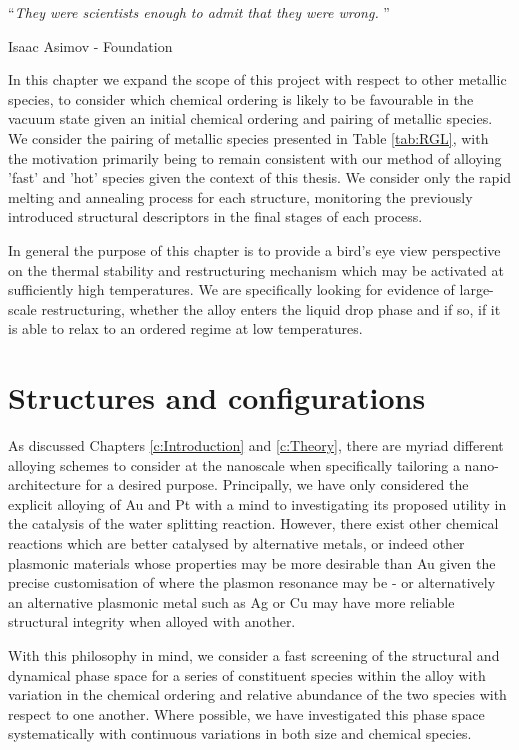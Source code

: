 
\noindent\enquote{\itshape They were scientists enough to admit that they were wrong. }\bigbreak

\hfill Isaac Asimov - Foundation

\vspace*{0.05\textheight}

In this chapter we expand the scope of this project with respect to other metallic species, to consider which chemical ordering is likely to be favourable in the vacuum state given an initial chemical ordering and pairing of metallic species. We consider the pairing of metallic species presented in Table \ref{tab:RGL}, with the motivation primarily being to remain consistent with our method of alloying 'fast' and 'hot' species given the context of this thesis. We consider only the rapid melting and annealing process for each structure, monitoring the previously introduced structural descriptors in the final stages of each process.

In general the purpose of this chapter is to provide a bird's eye view perspective on the thermal stability and restructuring mechanism which may be activated at sufficiently high temperatures. We are specifically looking for evidence of large-scale restructuring, whether the alloy enters the liquid drop phase and if so, if it is able to relax to an ordered regime at low temperatures.

\section{Structures and configurations}
\label{sec:alloy_strucs}

As discussed Chapters \ref{c:Introduction} and \ref{c:Theory}, there are myriad different alloying schemes to consider at the nanoscale when specifically tailoring a nano-architecture for a desired purpose. Principally, we have only considered the explicit alloying of Au and Pt with a mind to investigating its proposed utility in the catalysis of the water splitting reaction. However, there exist other chemical reactions which are better catalysed by alternative metals, or indeed other plasmonic materials whose properties may be more desirable than Au given the precise customisation of where the plasmon resonance may be - or alternatively an alternative plasmonic metal such as Ag or Cu may have more reliable structural integrity when alloyed with another.

With this philosophy in mind, we consider a fast screening of the structural and dynamical phase space for a series of constituent species within the alloy with variation in the chemical ordering and relative abundance of the two species with respect to one another. Where possible, we have investigated this phase space systematically with continuous variations in both size and chemical species.

